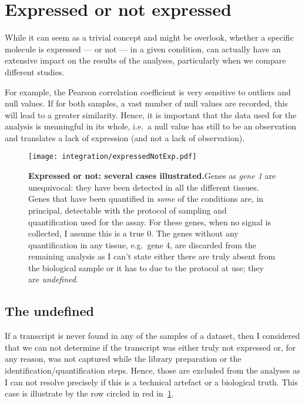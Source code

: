 \section{Expressed or not expressed}
\label{subsec:TransExpressedOrNot}
While it can seem as a trivial concept and might be overlook, whether a specific
molecule is expressed --- or not --- in a given condition, can actually have
an extensive impact on the results of the analyses, particularly when we compare
different studies.

For example, the Pearson correlation coefficient is very
sensitive to outliers and null values. If for both samples, a vast number of
null values are recorded, this will lead to a greater similarity.
Hence, it is important that the data used for the analysis is meaningful in
its whole, i.e.\ a null value has still to be an observation and translates
a lack of expression (and not a lack of observation).

\begin{figure}[!htbp]
  \texttt{[image: integration/expressedNotExp.pdf]}\centering
      \caption[Expressed or not: several cases illustrated]
      {\label{fig:DefineExpression}\textbf{Expressed or not: several cases
      illustrated.}\smallbreak{}Genes as \emph{gene 1} are unequivocal: they have been
      detected in all the different tissues. Genes that have been quantified in
      \emph{some} of the conditions are, in principal, detectable with the
      protocol of sampling and quantification used for the assay.
      For these genes, when no signal is collected, I assume this is a true $0$.
      The genes without any quantification
      in any tissue, e.g.\ gene 4, are discarded from the remaining analysis as
      I can't state
      either there are truly absent from the biological sample or it has to due
      to the protocol at use; they are \emph{undefined}.}
\end{figure}

\subsection{The undefined}
\label{subsec:IntegrationExpressedOrNot-undefined}
If a transcript is never found in any of the samples of a dataset,
then I considered that we can not determine if the transcript was
either truly not expressed or, for any reason, was not captured while the library
preparation or the identification/quantification steps. Hence, those are
excluded from the analyses as I can not resolve precisely if this is a
technical artefact or a biological truth. This case is illustrate by the row
circled in red in~\cref{fig:DefineExpression}.

